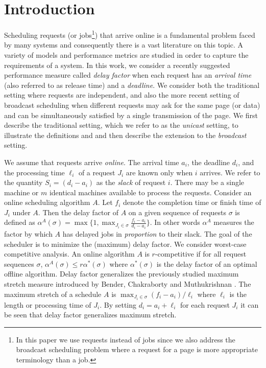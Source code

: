 \documentclass[11pt]{article}
\begin{document}
\section{Introduction}
Scheduling requests (or jobs\footnote{In this paper we use requests
  instead of jobs since we also address the broadcast scheduling
  problem where a request for a page is more appropriate terminology
  than a job.}) that arrive online is a fundamental problem faced by
many systems and consequently there is a vast literature on this
topic. A variety of models and performance metrics are studied in
order to capture the requirements of a system. In this work, we
consider a recently suggested performance measure called {\em delay
  factor} \cite{ChangEGK08} when each request has an {\em arrival
  time} (also referred to as release time) and a {\em deadline}. We
consider both the traditional setting where requests are independent,
and also the more recent setting of broadcast scheduling when
different requests may ask for the same page (or data) and can be
simultaneously satisfied by a single transmission of the page. We
first describe the traditional setting, which we refer to as the {\em
  unicast} setting, to illustrate the definitions and and then
describe the extension to the {\em broadcast} setting.

We assume that requests arrive {\em online}. The arrival time $a_i$,
the deadline $d_i$, and the processing time $\ell_i$ of a request
$J_i$ are known only when $i$ arrives. We refer to the quantity $S_i =
(d_i-a_i)$ as the {\em slack} of request $i$. There may be a single
machine or $m$ identical machines available to process the
requests. Consider an online scheduling algorithm $A$. Let $f_i$
denote the completion time or finish time of $J_i$ under $A$. Then the
delay factor of $A$ on a given sequence of requests $\sigma$ is
defined as $\alpha^A(\sigma) = \max\{1, \max_{J_i \in \sigma}
\frac{f_i - a_i}{d_i - a_i}\}$. In other words $\alpha^A$ measures the
factor by which $A$ has delayed jobs in {\em proportion} to their
slack. The goal of the
scheduler is to minimize the (maximum) delay factor. We consider
worst-case competitive analysis. An online algorithm $A$ is
$r$-competitive if for all request sequences $\sigma$,
$\alpha^A(\sigma) \le r \alpha^*(\sigma)$ where $\alpha^*(\sigma)$ is
the delay factor of an optimal offline algorithm.  Delay factor
generalizes the previously studied maximum stretch measure introduced
by Bender, Chakraborty and Muthukrishnan \cite{BenderCM98}. The
maximum stretch of a schedule $A$ is $\max_{J_i \in \sigma} (f_i -
a_i)/\ell_i$ where $\ell_i$ is the length or processing time of
$J_i$. By setting $d_i =a_i + \ell_i$ for each request $J_i$ it can be
seen that delay factor generalizes maximum stretch.
\end{document}
